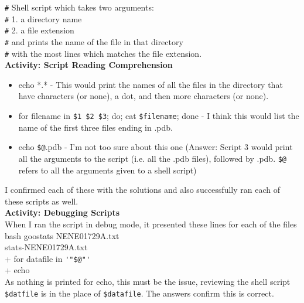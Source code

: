 \documentclass{article}
\begin{document}
\begin{FlushLeft}
\verb|#| Shell script which takes two arguments:\\
\verb|#| 1. a directory name\\
\verb|#| 2. a file extension\\
\verb|#| and prints the name of the file in that directory\\
\verb|#| with the most lines which matches the file extension.\\
\vspace{5mm}
\textbf{Activity: Script Reading Comprehension} \\
\begin{itemize}
    \item echo *.* - This would print the names of all the files in the directory that have characters (or none), a dot, and then more characters (or none).
    \item for filename in \verb|$1 $2 $3|; do; cat \verb|$filename|; done - I think this would list the name of the first three files ending in .pdb.
    \item echo \verb|$@|.pdb - I'm not too sure about this one (Answer: Script 3 would print all the arguments to the script (i.e. all the .pdb files), followed by .pdb. \verb|$@| refers to all the arguments given to a shell script)
\end{itemize}
I confirmed each of these with the solutions and also successfully ran each of these scripts as well.\\
\vspace{5mm}
\textbf{Activity: Debugging Scripts} \\
When I ran the script in debug mode, it presented these lines for each of the files\\
bash goostats NENE01729A.txt\\ stats-NENE01729A.txt\\
+ for datafile in \verb|'"$@"'|\\
+ echo\\
As nothing is printed for echo, this must be the issue, reviewing the shell script \verb|$datfile| is in the place of \verb|$datafile|. The answers confirm this is correct.
\vspace{5mm}


\end{FlushLeft}
\end{document}
